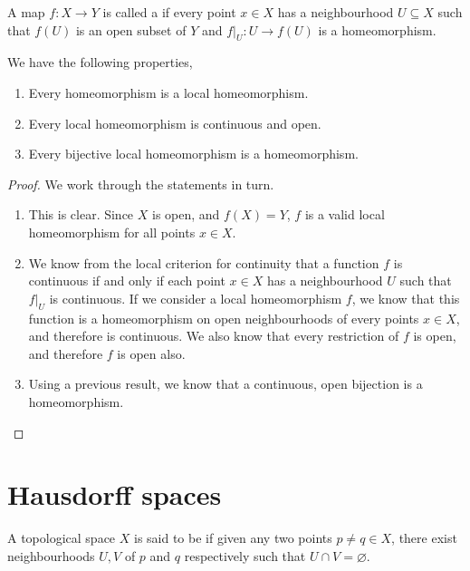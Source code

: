\begin{definition}
	A map $ f:X \to Y $ is called a  if every point $ x \in X $ has a neighbourhood $ U \subseteq X $ such that $ f ( U ) $ is an open subset of $ Y $ and $ f|_{U}:U \to f ( U ) $ is a homeomorphism.
\end{definition}

\begin{proposition}
	We have the following properties,
	\begin{enumerate}
		\item Every homeomorphism is a local homeomorphism.
		\item Every local homeomorphism is continuous and open.
		\item Every bijective local homeomorphism is a homeomorphism.
	\end{enumerate}
	\begin{proof}
		We work through the statements in turn.
		\begin{enumerate}
			\item This is clear. Since $ X $ is open, and $ f ( X ) = Y $, $ f $ is a valid local homeomorphism for all points $ x \in X $.
			\item We know from the local criterion for continuity that a function $ f $ is continuous if and only if each point $ x \in X $ has a neighbourhood $ U $ such that $ f|_{U} $ is continuous. If we consider a local homeomorphism $ f $, we know that this function is a homeomorphism on open neighbourhoods of every points $ x \in X $, and therefore is continuous. We also know that every restriction of $ f $ is open, and therefore $ f $ is open also.
			\item Using a previous result, we know that a continuous, open bijection is a homeomorphism.
		\end{enumerate}
	\end{proof}
\end{proposition}

\section{Hausdorff spaces}
\begin{definition}[Hausdorff]
	A topological space $ X $ is said to be  if given any two points $ p \neq q \in X $, there exist neighbourhoods $ U, V $ of $ p $ and $ q $ respectively such that $ U \cap V = \varnothing $.
\end{definition}

